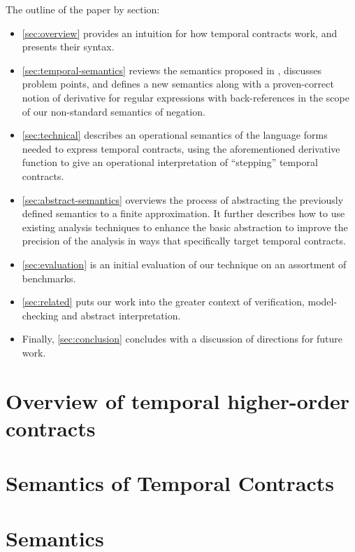 The outline of the paper by section:

\begin{itemize}
\item{\autoref{sec:overview} provides an intuition for how temporal
  contracts work, and presents their syntax.}
%
\item{\autoref{sec:temporal-semantics} reviews the semantics proposed in
  \dfm, discusses problem points, and defines a new semantics along
  with a proven-correct notion of derivative for regular expressions
  with back-references in the scope of our non-standard semantics of
  negation.}
%
\item{\autoref{sec:technical} describes an operational semantics of the
  language forms needed to express temporal contracts, using the
  aforementioned derivative function to give an operational
  interpretation of ``stepping'' temporal contracts.}
%
\item{\autoref{sec:abstract-semantics} overviews the process of
  abstracting the previously defined semantics to a finite
  approximation.
%
  It further describes how to use existing analysis techniques to enhance the basic abstraction to improve the precision of the analysis in ways that specifically target temporal contracts.}
%
\item{\autoref{sec:evaluation} is an initial evaluation of our technique on an assortment of benchmarks.}
%
\item{\autoref{sec:related} puts our work into the greater context of verification, model-checking and abstract interpretation.}
%
\item{Finally, \autoref{sec:conclusion} concludes with a discussion of directions for future work.}
%
\end{itemize}
\section{Overview of temporal higher-order contracts}\label{sec:overview}


\section{Semantics of Temporal Contracts} \label{sec:temporal-semantics}



\section{Semantics}\label{sec:technical}

